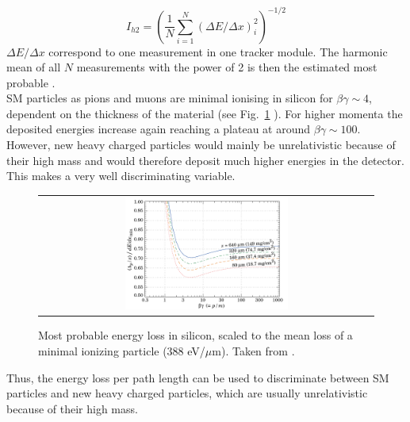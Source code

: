 \begin{equation}
I_{h2}=\left( \frac{1}{N}\sum_{i=1}^{N}(\Delta E/\Delta x)_i^2 \right)^{-1/2}
\end{equation}
$\Delta E /\Delta x$ correspond to one measurement in one tracker module. 
The harmonic mean of all $N$ measurements with the power of 2 is then the estimated most probable \dedx.\\

SM particles as pions and muons are minimal ionising in silicon for $\beta\gamma \sim 4$, dependent on the thickness of the material (see Fig.~\ref{fig:dEdx_Landau_Silicon} ). 
For higher momenta the deposited energies increase again reaching a plateau at around $\beta\gamma\sim100$. 
However, new heavy charged particles would mainly be unrelativistic because of their high mass and would therefore deposit much higher energies in the detector.
This makes \dedx  a very well discriminating variable.
\begin{figure}[!bt]
  \centering 
  \begin{tabular}{c}
  \includegraphics[width=0.5\textwidth]{figures/analysis/dEdx_Landau_Silicon.png}
  \end{tabular}
  \caption{Most probable energy loss in silicon, scaled to the mean loss of a minimal ionizing particle (388 eV/$\mu$m). Taken from \cite{bib:PDG_2014}.} 
  \label{fig:dEdx_Landau_Silicon}
\end{figure}
Thus, the energy loss per path length can be used to discriminate between SM particles and new heavy charged particles, which are usually unrelativistic because of their high mass.





